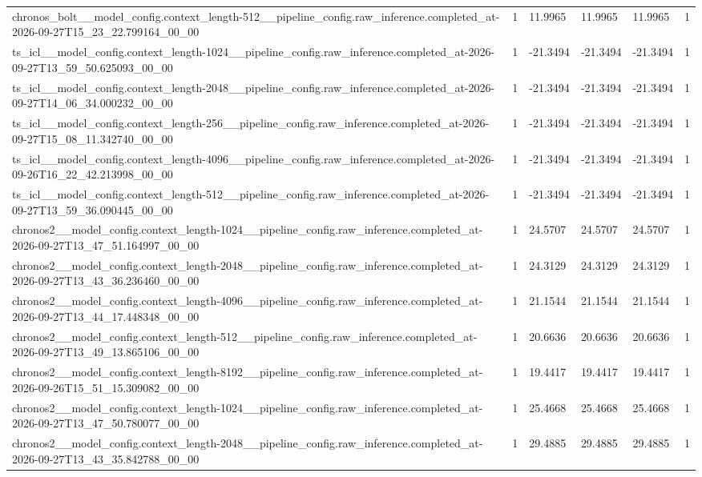 \begin{tabular}{llllll}
chronos\_bolt\_\_model\_config.context\_length-512\_\_pipeline\_config.raw\_inference.completed\_at-2026-09-27T15\_23\_22.799164\_00\_00 & 1 & 11.9965 & 11.9965 & 11.9965 & 1 \\
ts\_icl\_\_model\_config.context\_length-1024\_\_pipeline\_config.raw\_inference.completed\_at-2026-09-27T13\_59\_50.625093\_00\_00 & 1 & -21.3494 & -21.3494 & -21.3494 & 1 \\
ts\_icl\_\_model\_config.context\_length-2048\_\_pipeline\_config.raw\_inference.completed\_at-2026-09-27T14\_06\_34.000232\_00\_00 & 1 & -21.3494 & -21.3494 & -21.3494 & 1 \\
ts\_icl\_\_model\_config.context\_length-256\_\_pipeline\_config.raw\_inference.completed\_at-2026-09-27T15\_08\_11.342740\_00\_00 & 1 & -21.3494 & -21.3494 & -21.3494 & 1 \\
ts\_icl\_\_model\_config.context\_length-4096\_\_pipeline\_config.raw\_inference.completed\_at-2026-09-26T16\_22\_42.213998\_00\_00 & 1 & -21.3494 & -21.3494 & -21.3494 & 1 \\
ts\_icl\_\_model\_config.context\_length-512\_\_pipeline\_config.raw\_inference.completed\_at-2026-09-27T13\_59\_36.090445\_00\_00 & 1 & -21.3494 & -21.3494 & -21.3494 & 1 \\
chronos2\_\_model\_config.context\_length-1024\_\_pipeline\_config.raw\_inference.completed\_at-2026-09-27T13\_47\_51.164997\_00\_00 & 1 & 24.5707 & 24.5707 & 24.5707 & 1 \\
chronos2\_\_model\_config.context\_length-2048\_\_pipeline\_config.raw\_inference.completed\_at-2026-09-27T13\_43\_36.236460\_00\_00 & 1 & 24.3129 & 24.3129 & 24.3129 & 1 \\
chronos2\_\_model\_config.context\_length-4096\_\_pipeline\_config.raw\_inference.completed\_at-2026-09-27T13\_44\_17.448348\_00\_00 & 1 & 21.1544 & 21.1544 & 21.1544 & 1 \\
chronos2\_\_model\_config.context\_length-512\_\_pipeline\_config.raw\_inference.completed\_at-2026-09-27T13\_49\_13.865106\_00\_00 & 1 & 20.6636 & 20.6636 & 20.6636 & 1 \\
chronos2\_\_model\_config.context\_length-8192\_\_pipeline\_config.raw\_inference.completed\_at-2026-09-26T15\_51\_15.309082\_00\_00 & 1 & 19.4417 & 19.4417 & 19.4417 & 1 \\
chronos2\_\_model\_config.context\_length-1024\_\_pipeline\_config.raw\_inference.completed\_at-2026-09-27T13\_47\_50.780077\_00\_00 & 1 & 25.4668 & 25.4668 & 25.4668 & 1 \\
chronos2\_\_model\_config.context\_length-2048\_\_pipeline\_config.raw\_inference.completed\_at-2026-09-27T13\_43\_35.842788\_00\_00 & 1 & 29.4885 & 29.4885 & 29.4885 & 1 \\

\end{tabular}
